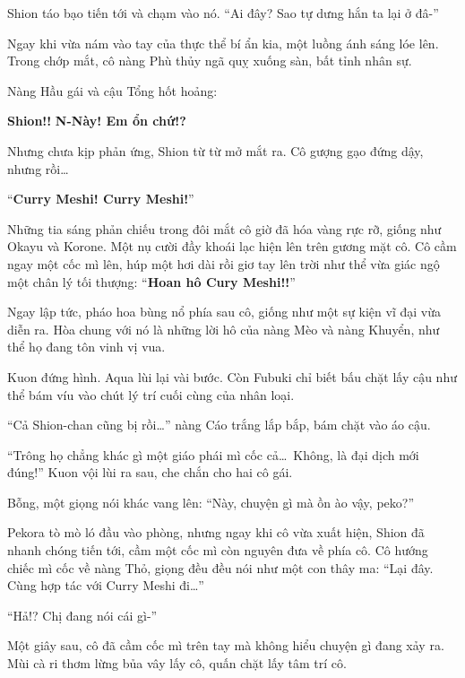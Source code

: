 \documentclass[../main.tex]{subfiles}
\begin{document}

Shion táo bạo tiến tới và chạm vào nó. ``Ai đây? Sao tự dưng hắn ta lại ở đâ-''

Ngay khi vừa nám vào tay của thực thể bí ẩn kia, một luồng ánh sáng lóe lên. Trong chớp mắt, cô nàng Phù thủy ngã quỵ xuống sàn, bất tỉnh nhân sự.

Nàng Hầu gái và cậu Tổng hốt hoảng:

\begin{dialogue}
     \textbf{Shion!!}
     \textbf{N-Này! Em ổn chứ!?}
\end{dialogue}

Nhưng chưa kịp phản ứng, Shion từ từ mở mắt ra. Cô gượng gạo đứng dậy, nhưng rồi\dots

``\textbf{Curry Meshi! Curry Meshi!}''

Những tia sáng phản chiếu trong đôi mắt cô giờ đã hóa vàng rực rỡ, giống như Okayu và Korone. Một nụ cười đầy khoái lạc hiện lên trên gương mặt cô. Cô cầm ngay một cốc mì lên, húp một hơi dài rồi giơ tay lên trời như thể vừa giác ngộ một chân lý tối thượng: ``\textbf{Hoan hô Cury Meshi!!}''

Ngay lập tức, pháo hoa bùng nổ phía sau cô, giống như một sự kiện vĩ đại vừa diễn ra. Hòa chung với nó là những lời hô của nàng Mèo và nàng Khuyển, như thể họ đang tôn vinh vị vua.


Kuon đứng hình. Aqua lùi lại vài bước. Còn Fubuki chỉ biết bấu chặt lấy cậu như thể bám víu vào chút lý trí cuối cùng của nhân loại.

``Cả Shion-chan cũng bị rồi\dots'' nàng Cáo trắng lắp bắp, bám chặt vào áo cậu.

``Trông họ chẳng khác gì một giáo phái mì cốc cả\dots\ Không, là đại dịch mới đúng!'' Kuon vội lùi ra sau, che chắn cho hai cô gái.

Bỗng, một giọng nói khác vang lên: ``Này, chuyện gì mà ồn ào vậy, peko?''

Pekora tò mò ló đầu vào phòng, nhưng ngay khi cô vừa xuất hiện, Shion đã nhanh chóng tiến tới, cầm một cốc mì còn nguyên đưa về phía cô. Cô hướng chiếc mì cốc về nàng Thỏ, giọng đều đều nói như một con thây ma: ``Lại đây. Cùng hợp tác với Curry Meshi đi\dots''

``Hả!? Chị đang nói cái gì-''

Một giây sau, cô đã cầm cốc mì trên tay mà không hiểu chuyện gì đang xảy ra. Mùi cà ri thơm lừng bủa vây lấy cô, quấn chặt lấy tâm trí cô.
\end{document}
